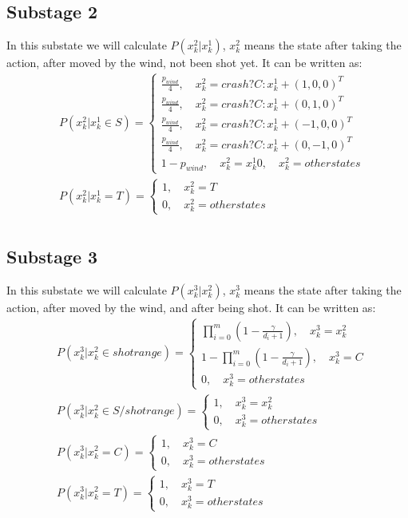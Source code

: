 \documentclass[fleqn,12pt, a4paper]{article}
\theoremstyle{definition}
\numberwithin{equation}{section}
\begin{document}
\subsection{Substage 2}
In this substate we will calculate $P(x_k^2|x_k^1)$, $x_k^2$ means the state after taking the action, after moved by the wind, not been shot yet. It can be written as:
\begin{align*}
&P(x_k^2|x_k^1\in S)=
\begin{cases}
\frac{p_{wind}}{4}, \quad x_k^2=crash? C:x_k^1+(1,0,0)^T\\
\frac{p_{wind}}{4}, \quad x_k^2=crash? C:x_k^1+(0,1,0)^T\\
\frac{p_{wind}}{4}, \quad x_k^2=crash? C:x_k^1+(-1,0,0)^T\\
\frac{p_{wind}}{4}, \quad x_k^2=crash? C:x_k^1+(0,-1,0)^T\\
1-p_{wind}, \quad x_k^2=x_k^1
0, \quad x_k^2=otherstates
\end{cases}\\
&P(x_k^2|x_k^1=T)=
\begin{cases}
1, \quad x_k^2=T\\
0, \quad x_k^2=otherstates
\end{cases}\\
\end{align*}

\subsection{Substage 3}
In this substate we will calculate $P(x_k^3|x_k^2)$, $x_k^3$ means the state after taking the action, after moved by the wind, and after being shot. It can be written as:
\begin{align*}
&P(x_k^3|x_k^2\in shotrange)=
\begin{cases}
\prod_{i=0}^{m}(1-\frac{\gamma}{d_i+1}), \quad x_k^3=x_k^2\\
1-\prod_{i=0}^{m}(1-\frac{\gamma}{d_i+1}), \quad x_k^3 =C \\
0, \quad x_k^3 = otherstates
\end{cases}\\
&P(x_k^3|x_k^2\in S/shotrange)=
\begin{cases}
1, \quad x_k^3=x_k^2\\
0, \quad x_k^3=otherstates
\end{cases}\\
&P(x_k^3|x_k^2=C)=
\begin{cases}
1, \quad x_k^3=C\\
0, \quad x_k^3=otherstates
\end{cases}\\
&P(x_k^3|x_k^2=T)=
\begin{cases}
1, \quad x_k^3=T\\
0, \quad x_k^3=otherstates
\end{cases}\\
\end{align*}
\end{document}
